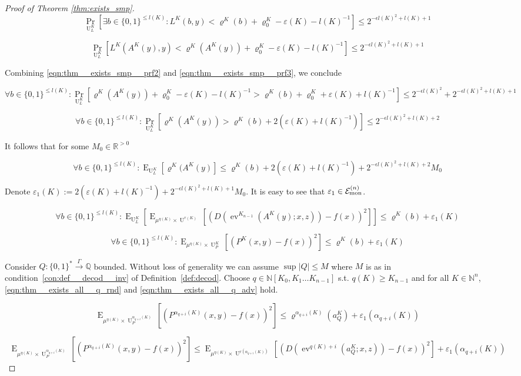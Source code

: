 \documentclass{article}
\numberwithin{equation}{section}
\theoremstyle{definition}
\theoremstyle{plain}
\newcommand{\Bool}{\{0,1\}}
\newcommand{\Words}{{\Bool^*}}
\DeclareMathOperator{\Prb}{Pr}
\DeclareMathOperator{\E}{E}
\DeclareMathOperator{\Ev}{ev}
\DeclareMathOperator{\Un}{U}
\newcommand{\Nats}{\mathbb{N}}
\newcommand{\Rats}{\mathbb{Q}}
\newcommand{\Reals}{\mathbb{R}}
\newcommand{\NatPoly}{\Nats[K_0, K_1 \ldots K_{n-1}]}
\newcommand{\Abs}[1]{\lvert #1 \rvert}
\newcommand{\Fall}{\mathcal{E}}
\newcommand{\FallM}{\Fall_{\textnormal{mon}}^{(n)}}
\newcommand{\Scheme}{\xrightarrow{\Gamma}}
\begin{document}
\begin{proof}[Proof of Theorem \ref{thm:exists_smp}]
\[\Prb_{\Un_L^K}[\exists b \in \Bool^{\leq l(K)}: L^K(b,y) < \varrho^K(b) + \varrho_0^K - \varepsilon(K) - l(K)^{-1}] \leq 2^{-\epsilon l(K)^2+l(K)+1}\]

\begin{equation}
\label{eqn:thm__exists_smp__prf3}
\Prb_{\Un_L^K}[L^K(A^K(y),y) < \varrho^K(A^K(y)) + \varrho_0^K - \varepsilon(K) - l(K)^{-1}] \leq 2^{-\epsilon l(K)^2+l(K)+1}
\end{equation}

Combining \ref{eqn:thm__exists_smp__prf2} and \ref{eqn:thm__exists_smp__prf3}, we conclude

\[\forall b \in \Bool^{\leq l(K)}: \Prb_{\Un_L^K}[\varrho^K(A^K(y)) + \varrho_0^K - \varepsilon(K) - l(K)^{-1} > \varrho^K(b) + \varrho_0^K + \varepsilon(K) + l(K)^{-1}] \leq 2^{-\epsilon l(K)^2} + 2^{-\epsilon l(K)^2+l(K)+1}\]

\[\forall b \in \Bool^{\leq l(K)}: \Prb_{\Un_L^K}[\varrho^K(A^K(y)) > \varrho^K(b) + 2(\varepsilon(K) + l(K)^{-1})] \leq 2^{-\epsilon l(K)^2+l(K)+2}\]

It follows that for some ${M_0 \in \Reals^{>0}}$

\[\forall b \in \Bool^{\leq l(K)}: \E_{\Un_L^K}[\varrho^K(A^K(y)] \leq \varrho^K(b) + 2(\varepsilon(K) + l(K)^{-1}) + 2^{-\epsilon l(K)^2+l(K)+2} M_0\]

 Denote ${\varepsilon_1(K):=2(\varepsilon(K) + l(K)^{-1}) + 2^{-\epsilon l(K)^2+l(K)+1} M_0}$. It is easy to see that ${\varepsilon_1 \in \FallM}$.

\[\forall b \in \Bool^{\leq l(K)}: \E_{\Un_L^K}[\E_{\mu^{\eta(K)} \times \Un^{r(K)}}[(D(\Ev^{K_{n-1}}(A^K(y);x,z))-f(x))^2]] \leq \varrho^K(b) + \varepsilon_1(K)\]

\[\forall b \in \Bool^{\leq l(K)}: \E_{\mu^{\eta(K)} \times \Un_P^K}[(P^K(x,y)-f(x))^2] \leq \varrho^K(b) + \varepsilon_1(K)\]

Consider ${Q: \Words \Scheme \Rats}$ bounded. Without loss of generality we can assume ${\sup \Abs{Q} \leq M}$ where ${M}$ is as in condition~\ref{con:def__decod__inv} of Definition~\ref{def:decod}. Choose ${q \in \NatPoly}$ s.t. ${q(K) \geq K_{n-1}}$ and for all ${K \in \Nats^n}$, \ref{eqn:thm__exists_all__q_rnd} and \ref{eqn:thm__exists_all__q_adv} hold.

\[\E_{\mu^{\eta(K)} \times \Un_P^{\alpha_{q+i}(K)}}[(P^{\alpha_{q+i}(K)}(x,y)-f(x))^2] \leq \varrho^{\alpha_{q+i}(K)}(a_Q^K) + \varepsilon_1(\alpha_{q+i}(K))\]

\[\E_{\mu^{\eta(K)} \times \Un_P^{\alpha_{q+i}(K)}}[(P^{\alpha_{q+i}(K)}(x,y)-f(x))^2] \leq \E_{\mu^{\eta(K)} \times \Un^{r(\alpha_{q+i}(K))}}[(D(\Ev^{q(K)+i}(a_Q^K;x,z))-f(x))^2] + \varepsilon_1(\alpha_{q+i}(K))\]


\end{proof}
\end{document}
